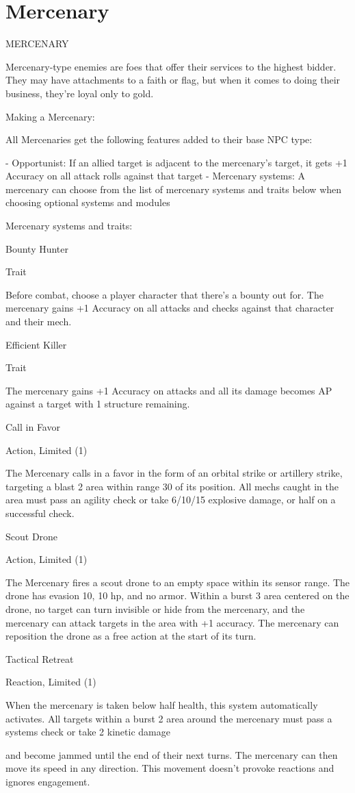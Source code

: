 \section{Mercenary}
                                                MERCENARY  

Mercenary-type enemies are foes that offer their services to the highest bidder. They may have  
attachments to a faith or flag, but when it comes to doing their business, they’re loyal only to  
gold.    
 
 
Making a Mercenary:
 
All Mercenaries get the following features added to their base NPC type:
 
     -   Opportunist: If an allied target is adjacent to the mercenary’s target, it gets +1 Accuracy  
         on all attack rolls against that target  
     -   Mercenary systems: A mercenary can choose from the list of mercenary systems and  
         traits below when choosing optional systems and modules  

Mercenary systems and traits:
 
Bounty Hunter
 
Trait
 
Before combat, choose a player character that there’s a bounty out for. The mercenary gains +1  
Accuracy on all attacks and checks against that character and their mech.
 

Efficient Killer
 
Trait
 
The mercenary gains +1 Accuracy on attacks and all its damage becomes AP against a target  
with 1 structure remaining.
 

Call in Favor
 
Action, Limited (1)
 
The Mercenary calls in a favor in the form of an orbital strike or artillery strike, targeting a blast 2  
area within range 30 of its position. All mechs caught in the area must pass an agility check or  
take 6/10/15 explosive damage, or half on a successful check.
 

Scout Drone
 
Action, Limited (1)
 
The Mercenary fires a scout drone to an empty space within its sensor range. The drone has  
evasion 10, 10 hp, and no armor. Within a burst 3 area centered on the drone, no target can turn  
invisible or hide from the mercenary, and the mercenary can attack targets in the area with +1  
accuracy. The mercenary can reposition the drone as a free action at the start of its turn.
 

Tactical Retreat
 
Reaction, Limited (1)
 
When the mercenary is taken below half health, this system automatically activates. All targets  
within a burst 2 area around the mercenary must pass a systems check or take 2 kinetic damage  

                                                                                                                   


and become jammed until the end of their next turns. The mercenary can then move its speed in  
any direction. This movement doesn't provoke reactions and ignores engagement.
 